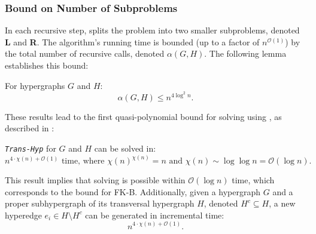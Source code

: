 \subsubsection*{Bound on Number of Subproblems}

In each recursive step, \FKA{} splits the problem into two smaller subproblems, denoted \textbf{L} and \textbf{R}. The algorithm's running time is bounded (up to a factor of $n^{\mathcal{O}(1)}$) by the total number of recursive calls, denoted $\alpha(G,H)$. The following lemma establishes this bound:

\begin{lemma}\label{lem:subproblems}
For hypergraphs $G$ and $H$:
\[
\alpha(G,H)\leq n^{4\log^2 n}.
\]
\end{lemma}
\noindent\textit{\cite{FK96}}

These results lead to the first quasi-polynomial bound for solving \TransHyp{} using \FKA, as described in \cite{FK96}:

\begin{theorem}
\textit{\texttt{Trans-Hyp}} for $G$ and $H$ can be solved in:
\[
n^{4\cdot\chi(n)+\mathcal{O}(1)}\text{ time, where }\chi(n)^{\chi(n)}=n\text{ and }\chi(n)\sim\log\log n=\mathcal{O}(\log n).
\]
\end{theorem}

This result implies that solving \TransHyp{} is possible within $\mathcal{O}(\log n)$ time, which corresponds to the bound for FK-B. Additionally, given a hypergraph $G$ and a proper subhypergraph of its transversal hypergraph $H$, denoted $H^c\subseteq H$, a new hyperedge $e_i\in H\setminus H^c$ can be generated in incremental time:
\[
n^{4\cdot\chi(n)+\mathcal{O}(1)}.
\]
